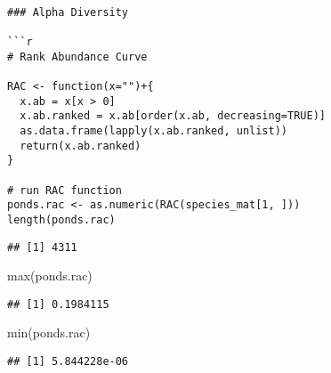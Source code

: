 \documentclass[
]{article}
\newenvironment{Shaded}{\begin{snugshade}}{\end{snugshade}}
\newcommand{\FunctionTok}[1]{\textcolor[rgb]{0.00,0.00,0.00}{#1}}
\newcommand{\NormalTok}[1]{#1}
\begin{document}
\begin{verbatim}

### Alpha Diversity 

```r
# Rank Abundance Curve

RAC <- function(x="")+{
  x.ab = x[x > 0]
  x.ab.ranked = x.ab[order(x.ab, decreasing=TRUE)]
  as.data.frame(lapply(x.ab.ranked, unlist))
  return(x.ab.ranked)
}

# run RAC function
ponds.rac <- as.numeric(RAC(species_mat[1, ]))
length(ponds.rac)
\end{verbatim}

\begin{verbatim}
## [1] 4311
\end{verbatim}

\begin{Shaded}
\begin{Highlighting}[]
\FunctionTok{max}\NormalTok{(ponds.rac)}
\end{Highlighting}
\end{Shaded}

\begin{verbatim}
## [1] 0.1984115
\end{verbatim}

\begin{Shaded}
\begin{Highlighting}[]
\FunctionTok{min}\NormalTok{(ponds.rac)}
\end{Highlighting}
\end{Shaded}

\begin{verbatim}
## [1] 5.844228e-06
\end{verbatim}
\end{document}
